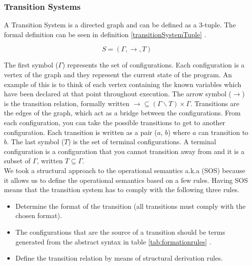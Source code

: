 \subsubsection{Transition Systems}
A Transition System is a directed graph and can be defined as a 3-tuple. The formal definition can be seen in definition \ref{transitionSystemTuple} \cite{SS_lecture_8}. 

\begin{equation} \label{transitionSystemTuple}
    S = (\Gamma, \rightarrow, T)
\end{equation}

\noindent The first symbol ($\Gamma$) represents the set of configurations. Each configuration is a vertex of the graph and they represent the current state of the program. An example of this is to think of each vertex containing the known variables which have been declared at that point throughout execution. The arrow symbol ($\rightarrow$) is the transition relation, formally written $\rightarrow \subseteq (\Gamma \backslash T) \times \Gamma$.
Transitions are the edges of the graph, which act as a bridge between the configurations. From each configuration, you can take the possible transitions to get to another configuration. Each transition is written as a pair ($a$, $b$) where $a$ can transition to $b$. The last symbol ($T$) is the set of terminal configurations. A terminal configuration is a configuration that you cannot transition away from and it is a subset of $\Gamma$, written $T \subseteq \Gamma$. \cite{SS_lecture_8} \\

We took a structural approach to the operational semantics a.k.a (SOS) because it allows us to define the operational semantics based on a few rules. Having SOS means that the transition system has to comply with the following three rules.

\begin{itemize}
    \item Determine the format of the transition (all transitions must comply with the chosen format)\cite{SS_lecture_8}. 
    \item The configurations that are the source of a transition should be terms generated from the abstract syntax in table \ref{tab:formationrules} \cite{SS_lecture_8}.
    \item Define the transition relation by means of structural                 derivation rules\cite{SS_lecture_8}.
\end{itemize} \\

